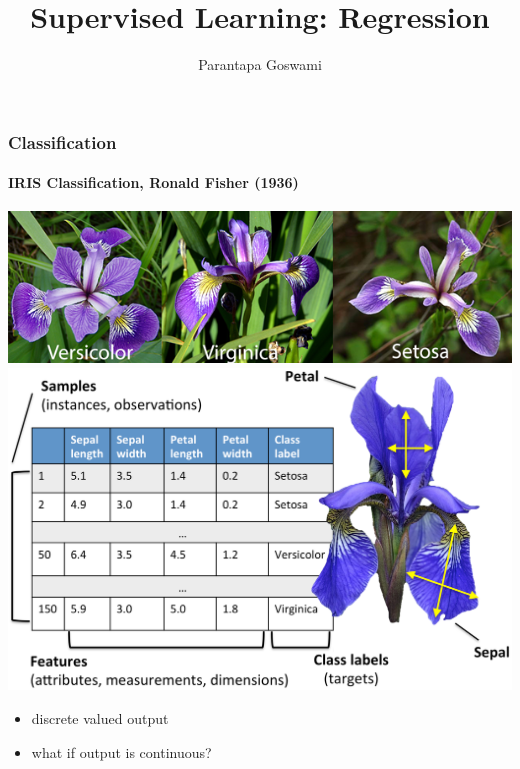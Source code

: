 \documentclass[xcolor=pdftex,dvipsnames]{beamer}
\title{Supervised Learning: Regression}
\author[Parantapa]{Parantapa Goswami}
\institute[Viseo]{\color{viseoblue} Viseo R\&D\\Grenoble, France\\{\tiny \texttt{parantapa.goswami@viseo.com}}}
\begin{document}
\frame[plain]{
\titlepage
}

\begin{frame}
  \frametitle{Classification}
  \framesubtitle{IRIS Classification, Ronald Fisher (1936)}
  \begin{minipage}{0.69\linewidth}
    \begin{center}
      \includegraphics[scale=0.3]{./fig/iris_classes.png}\\ \vspace{0.2cm}
      \pause
      \includegraphics[scale=0.1]{./fig/iris_features.png}
    \end{center}
  \end{minipage}
  \begin{minipage}{0.29\linewidth}
    \begin{itemize}
    \pause
    \item discrete valued output
    \pause
    \item what if output is continuous?
    \end{itemize}
  \end{minipage}
\end{frame}
\end{document}
